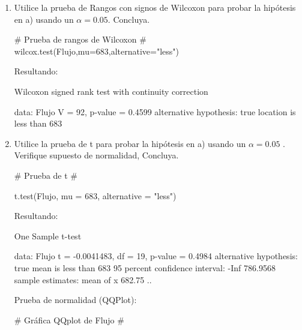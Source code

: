 \documentclass[a4paper,12pt]{article} %
\begin{document}
\begin{enumerate} [label=\textbf{\alph*})]
\begin{MyVerbatim}
		Exact binomial test
			
data:  8 and 19
number of successes = 8, number of trials = 19,
p-value = 0.3238
alternative hypothesis: true probability of success is less than 0.5
95 percent confidence interval:
0.0000000 0.6318848
sample estimates:
probability of success 
0.4210526
				\end{MyVerbatim}
		\item {Utilice la prueba de Rangos con signos de Wilcoxon para probar la hipótesis en a) usando un \( \alpha = 0.05 \).
					Concluya.}
					\begin{MyVerbatim}
 	# Prueba de rangos de Wilcoxon #
wilcox.test(Flujo,mu=683,alternative="less")
					\end{MyVerbatim}
				Resultando:
				
				\begin{MyVerbatim}
	Wilcoxon signed rank test with continuity correction
					
data:  Flujo
V = 92, p-value = 0.4599
alternative hypothesis: true location is less than 683
				\end{MyVerbatim}
	   	\item {Utilice la prueba de t para probar la hipótesis en a) usando un  \( \alpha = 0.05 \) . Verifique supuesto de normalidad, Concluya.}
			\begin{MyVerbatim}
	# Prueba de t #
				
t.test(Flujo, mu = 683, alternative = "less")
				
			\end{MyVerbatim}
			Resultando: 
			\begin{MyVerbatim}
	One Sample t-test
				
data:  Flujo
t = -0.0041483, df = 19, p-value = 0.4984
alternative hypothesis: true mean is less than 683
95 percent confidence interval: -Inf 786.9568
sample estimates: mean of x  682.75 ..
\end{MyVerbatim}
Prueba de normalidad (QQPlot):
			\begin{MyVerbatim}
	# Gráfica QQplot de Flujo # 
				

\end{MyVerbatim}
\end{enumerate}
\end{document}

